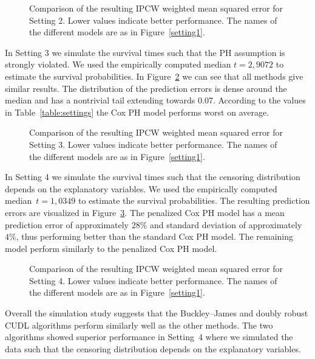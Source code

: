 \documentclass[12pt, a4paper]{scrartcl}
\theoremstyle{definition}
\theoremstyle{plain}
\numberwithin{equation}{section}
\numberwithin{figure}{section}
\numberwithin{table}{section}
\begin{document}
	\begin{figure}
		\centering	
		
		\vspace{-0.3cm}
		\caption{Comparison of the resulting IPCW weighted mean squared error for Setting 2. Lower values indicate better performance. The names of the different models are as in Figure~\ref{setting1}.}
		\label{setting2}
	\end{figure}
	
	In Setting 3 we simulate the survival times such that the PH assumption is strongly violated.
	We used the empirically computed median $t = 2,9072$ to estimate the survival probabilities.
	In Figure~\ref{setting3} we can see that all methods give similar results.
	The distribution of the prediction errors is dense around the median and has a nontrivial tail extending towards {0.07}.
	According to the values in Table~\ref{table:settings} the Cox PH model performs worst on average.
	
	
	
	\begin{figure}
		\centering	
		
		\vspace{-0.3cm}
		\caption{Comparison of the resulting IPCW weighted mean squared error for Setting 3. Lower values indicate better performance. The names of the different models are as in Figure~\ref{setting1}.}
		\label{setting3}
	\end{figure}
	
	In Setting 4 we simulate the survival times such that the censoring distribution depends on the explanatory variables.
	We used the empirically computed median~$t = 1,0349$ to estimate the survival probabilities.
	The resulting prediction errors are visualized in Figure~\ref{setting4}.
	The penalized Cox PH model has a mean prediction error of approximately $28\%$ and standard deviation of approximately $4\%$, thus performing better than the standard Cox PH model.
	The remaining model perform similarly to the penalized Cox PH model.
	\begin{figure}
		\centering	
		
		\vspace{-0.3cm}
		\caption{Comparison of the resulting IPCW weighted mean squared error for Setting 4. Lower values indicate better performance. The names of the different models are as in Figure~\ref{setting1}.}
		\label{setting4}
	\end{figure}

	Overall the simulation study suggests that the Buckley--James and doubly robust CUDL algorithms perform similarly well as the other methods.
	The two algorithms showed superior performance in Setting~4 where we simulated the data such that the censoring distribution depends on the explanatory variables.
	
\end{document}
